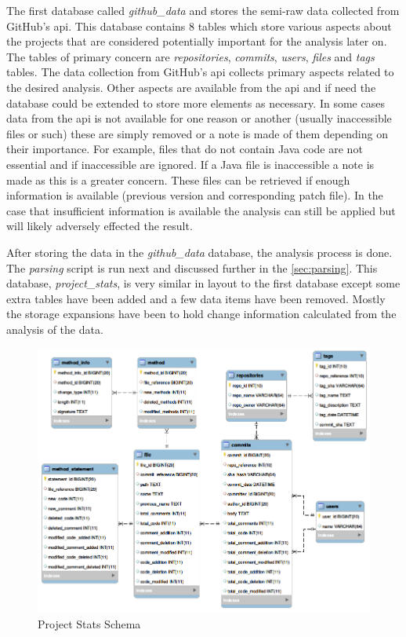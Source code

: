 The first database called \textit{github\_data} and stores the semi-raw data collected from GitHub's \gls{api}. This database contains 8 tables which store various aspects about the projects that are considered potentially important for the analysis later on. The tables of primary concern are \textit{repositories}, \textit{commits}, \textit{users}, \textit{files} and \textit{tags} tables. The data collection from GitHub's \gls{api} collects primary aspects related to the desired analysis. Other aspects are available from the \gls{api} and if need the database could be extended to store more elements as necessary. In some cases data from the \gls{api} is not available for one reason or another (usually inaccessible files or such) these are simply removed or a note is made of them depending on their importance. For example, files that do not contain Java code are not essential and if inaccessible are ignored. If a Java file is inaccessible a note is made as this is a greater concern. These files can be retrieved if enough information is available (previous version and corresponding patch file). In the case that insufficient information is available the analysis can still be applied but will likely adversely effected the result.

After storing the data in the \textit{github\_data} database, the analysis process is done. The \textit{parsing} script is run next and discussed further in the \autoref{sec:parsing}. This database, \textit{project\_stats}, is very similar in layout to the first database except some extra tables have been added and a few data items have been removed. Mostly the storage expansions have been to hold change information calculated from the analysis of the data.

\begin{figure}[!ht]
    \centering
        \includegraphics[width=1.0\textwidth]{images/project_stats_schema}
    \caption{Project Stats Schema}
    \label{fig:project_stats_schema}
\end{figure}

